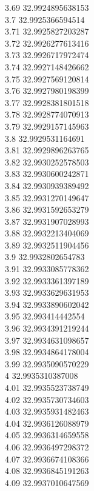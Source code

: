 {3.69	32.9924895638153\\
3.7	32.9925366594514\\
3.71	32.9925827203287\\
3.72	32.9926277613416\\
3.73	32.9926717972474\\
3.74	32.9927148426662\\
3.75	32.9927569120814\\
3.76	32.9927980198399\\
3.77	32.9928381801518\\
3.78	32.9928774070913\\
3.79	32.9929157145963\\
3.8	32.9929531164691\\
3.81	32.9929896263765\\
3.82	32.9930252578503\\
3.83	32.9930600242871\\
3.84	32.9930939389492\\
3.85	32.9931270149647\\
3.86	32.9931592653279\\
3.87	32.9931907028993\\
3.88	32.9932213404069\\
3.89	32.9932511904456\\
3.9	32.9932802654783\\
3.91	32.9933085778362\\
3.92	32.9933361397189\\
3.93	32.9933629631953\\
3.94	32.9933890602042\\
3.95	32.993414442554\\
3.96	32.9934391219244\\
3.97	32.9934631098657\\
3.98	32.9934864178004\\
3.99	32.9935090570229\\
4	32.9935310387008\\
4.01	32.9935523738749\\
4.02	32.9935730734603\\
4.03	32.9935931482463\\
4.04	32.9936126088979\\
4.05	32.9936314659558\\
4.06	32.9936497298372\\
4.07	32.9936674108366\\
4.08	32.9936845191263\\
4.09	32.9937010647569\\
}
